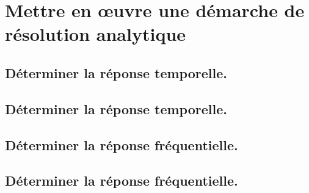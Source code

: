 \documentclass[10pt,fleqn]{book}
\newcommand{\repRel}{../..}
\newcommand{\repStyle}{\repRel/Style}
\newcommand{\td}{fichier_td}
\newcommand{\repExos}{\repRel/ExercicesCompetences}
\newcommand{\repExo}{dossier}
\begin{document}
\renewcommand{\repExo}{\repExos/C1_ProposerDemarche/C1_05_ProposerDemarcheActionMecaLoiMvt_PFS/STOCK/05_RT_02}
\renewcommand{\td}{05_RT_02}
\graphicspath{{\repStyle/png/}{\repExo/images/}}


\renewcommand{\repExo}{\repExos/C1_ProposerDemarche/C1_05_ProposerDemarcheActionMecaLoiMvt_PFS/STOCK/06_TR_02}
\renewcommand{\td}{06_TR_02}
\graphicspath{{\repStyle/png/}{\repExo/images/}}


\renewcommand{\repExo}{\repExos/C1_ProposerDemarche/C1_05_ProposerDemarcheActionMecaLoiMvt_PFS/STOCK/07_RR3D_02}
\renewcommand{\td}{07_RR3D_02}
\graphicspath{{\repStyle/png/}{\repExo/images/}}


\renewcommand{\repExo}{\repExos/C1_ProposerDemarche/C1_05_ProposerDemarcheActionMecaLoiMvt_PFS/STOCK/08_RR3D_02}
\renewcommand{\td}{08_RR3D_02}
\graphicspath{{\repStyle/png/}{\repExo/images/}}


\renewcommand{\repExo}{\repExos/C1_ProposerDemarche/C1_05_ProposerDemarcheActionMecaLoiMvt_PFS/STOCK/09_RT_RSG}
\renewcommand{\td}{09_RT_RSG}
\graphicspath{{\repStyle/png/}{\repExo/images/}}


\section{Mettre en œuvre une démarche de résolution analytique} 

\subsection{Déterminer la réponse temporelle.} 

\subsection{Déterminer la réponse temporelle.} 

\subsection{Déterminer la réponse fréquentielle. } 

\subsection{Déterminer la réponse fréquentielle. } 

\renewcommand{\repExo}{\repExos/C2_MettreEnOeuvreDemarche/C2_02_DiagrammeBode/510_Divers}
\renewcommand{\td}{510_Divers}
\graphicspath{{\repStyle/png/}{\repExo/images/}}

\end{document}

